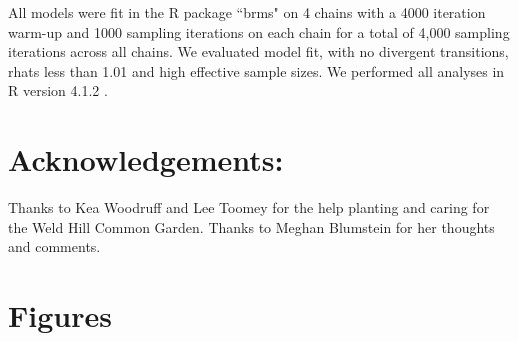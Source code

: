\documentclass{article}[12pt]
\begin{document}
All models were fit in the R package ``brms" \citep{Burkner2018} on 4 chains with a 4000 iteration warm-up and 1000 sampling iterations on each chain for a total of 4,000 sampling iterations across all chains. We evaluated model fit, with no divergent transitions, rhats less than 1.01 and high effective sample sizes. We performed all analyses in R version 4.1.2 \citep{R2021}.

\section{Acknowledgements:}
Thanks to Kea Woodruff and Lee Toomey for the help planting and caring for the Weld Hill Common Garden. Thanks to Meghan Blumstein for her thoughts and comments.

\newpage
\section{Figures} %
\end{document}
